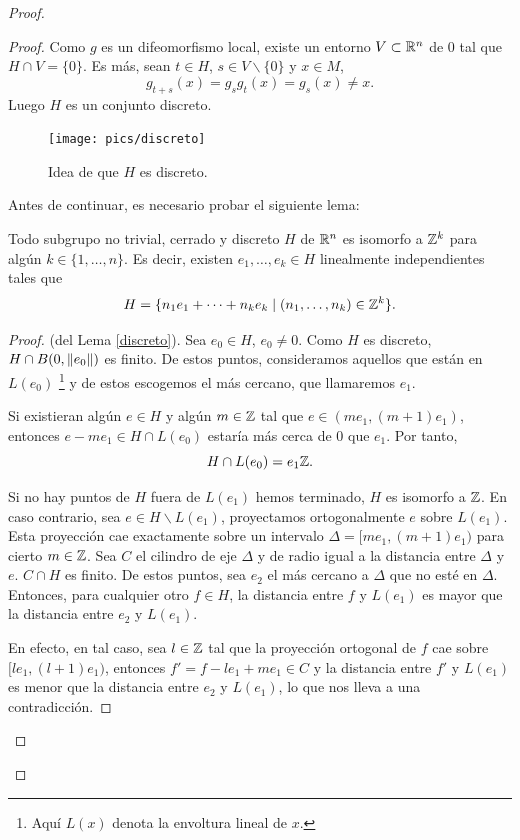 \begin{proof}
\begin{proof}
 Como $g$ es un difeomorfismo local, existe un entorno $V\subset \mathbb{R}^n$ de 0 tal que $H\cap V= \{0\}$. Es más, sean $t\in H$, $s\in V\backslash \{0\}$ y $x\in M$, 
  \[
    g_{t+s}(x)=g_sg_t(x)=g_s(x)\neq x.
  \]
  Luego $H$ es un conjunto discreto. 
  \begin{figure}[h]
    \centering
    \texttt{[image: pics/discreto]}
    \caption{Idea de que $H$ es discreto.}
    \label{fig:discreto}
  \end{figure}

  Antes de continuar, es necesario probar el siguiente lema:

  \begin{lema}\label{discreto}
    Todo subgrupo no trivial, cerrado y discreto $H$ de $\mathbb{R}^n$ es isomorfo a $\mathbb{Z}^k$ para algún $k\in\{1,\dots,n\}$. Es decir, existen $e_1,\dots,e_k \in H$ linealmente independientes tales que 
    \[
      H=\{n_1e_1+\cdots+n_ke_k \mid (n_1,\dots,n_k) \in \mathbb{Z}^k \}.
    \]
  \end{lema}
  \begin{proof}(del Lema \ref{discreto}). 
  Sea $e_0 \in H$, $e_0 \neq 0$. Como $H$ es discreto, $H \cap B(0,\left\Vert e_0\right\Vert)$ es finito. De estos puntos, consideramos aquellos que están en $L(e_0)$ \footnote{Aquí $L(x)$ denota la envoltura lineal de $x$.} y de estos escogemos el más cercano, que llamaremos $e_1$. 
  
  Si existieran algún $e \in H$ y algún $m \in \mathbb{Z}$ tal que $e \in (me_1,(m+1)e_1)$, entonces $e-me_1 \in H \cap L(e_0)$ estaría más cerca de 0 que $e_1$. Por tanto, 
  \[
    H\cap L(e_0) = e_1\mathbb{Z}.
  \]

  Si no hay puntos de $H$ fuera de $L(e_1)$ hemos terminado, $H$ es isomorfo a $\mathbb{Z}$. En caso contrario, sea $e \in H \backslash L(e_1)$, proyectamos ortogonalmente $e$ sobre $L(e_1)$. Esta proyección cae exactamente sobre un intervalo $\Delta=[me_1,(m+1)e_1)$ para cierto $m \in \mathbb{Z}$. Sea $C$ el cilindro de eje $\Delta$ y de radio igual a la distancia entre $\Delta$ y $e$. $C\cap H$ es finito. De estos puntos, sea $e_2$ el más cercano a $\Delta$ que no esté en $\Delta$. Entonces, para cualquier otro $f \in H$, la distancia entre $f$ y $L(e_1)$ es mayor que la distancia entre $e_2$ y $L(e_1)$. 
    
    En efecto, en tal caso, sea $l \in \mathbb{Z}$ tal que la proyección ortogonal de $f$ cae sobre $[le_1,(l+1)e_1)$, entonces $f'=f-le_1+me_1 \in C$ y la distancia entre $f'$ y $L(e_1)$ es menor que la distancia entre $e_2$ y $L(e_1)$, lo que nos lleva a una contradicción.


\end{proof}
\end{proof}
\end{proof}
